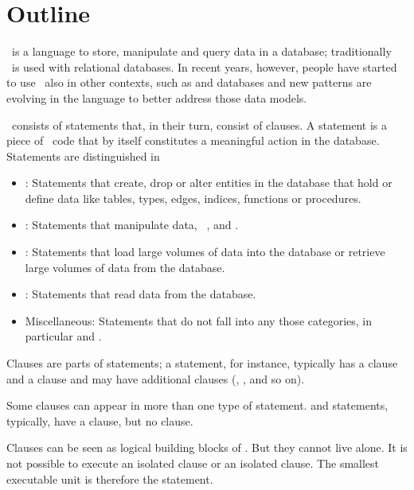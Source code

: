 \section{Outline}
\sql\ is a language to store, manipulate
and query data in a database; traditionally
\sql\ is used with relational databases.
In recent years, however, people have
started to use \sql\ also in other contexts,
such as  and 
databases and new patterns are evolving
in the language to better address those
data models.

\sql\ consists of statements that,
in their turn, consist of clauses.
A statement is a piece of \sql\ code
that by itself constitutes a meaningful
action in the database. Statements are
distinguished in

\begin{itemize}
\item {}:
Statements that create, drop or alter entities
in the database that hold or define
data
like tables, types, edges, indices,
functions or procedures.

\item {}:
Statements that manipulate data,
\eg\ ,  and
.

\item {}:
Statements that load large volumes of data into the database
or retrieve large volumes of data from the database.

\item {}:
Statements that read data from the database.

\item Miscellaneous:
Statements that do not fall into any
those categories, in particular
 and .
\end{itemize}

Clauses are parts of statements;
a  statement, for instance,
typically has a  clause and
a  clause and may have
additional clauses (,
,  and so on).

Some clauses can appear in more than
one type of statement. 
and  statements, typically,
have a  clause, but no
 clause.

Clauses can be seen as logical building blocks
of \sql. But they cannot live alone.
It is not possible to execute an isolated 
clause or an isolated  clause.
The smallest executable unit is therefore the statement.

